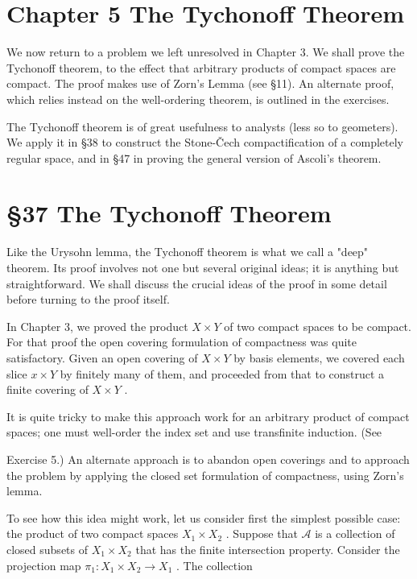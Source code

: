 \documentclass[10pt]{article}
\begin{document}
\section*{Chapter 5 The Tychonoff Theorem}

We now return to a problem we left unresolved in Chapter 3. We shall prove the Tychonoff theorem, to the effect that arbitrary products of compact spaces are compact. The proof makes use of Zorn's Lemma (see §11). An alternate proof, which relies instead on the well-ordering theorem, is outlined in the exercises.

The Tychonoff theorem is of great usefulness to analysts (less so to geometers). We apply it in §38 to construct the Stone-Čech compactification of a completely regular space, and in §47 in proving the general version of Ascoli's theorem.

\section*{§37 The Tychonoff Theorem}

Like the Urysohn lemma, the Tychonoff theorem is what we call a "deep" theorem. Its proof involves not one but several original ideas; it is anything but straightforward. We shall discuss the crucial ideas of the proof in some detail before turning to the proof itself.

In Chapter 3, we proved the product \(X \times  Y\) of two compact spaces to be compact. For that proof the open covering formulation of compactness was quite satisfactory. Given an open covering of \(X \times  Y\) by basis elements, we covered each slice \(x \times  Y\) by finitely many of them, and proceeded from that to construct a finite covering of \(X \times  Y\) .

It is quite tricky to make this approach work for an arbitrary product of compact spaces; one must well-order the index set and use transfinite induction. (See

Exercise 5.) An alternate approach is to abandon open coverings and to approach the problem by applying the closed set formulation of compactness, using Zorn's lemma.

To see how this idea might work, let us consider first the simplest possible case: the product of two compact spaces \({X}_{1} \times  {X}_{2}\) . Suppose that \(\mathcal{A}\) is a collection of closed subsets of \({X}_{1} \times  {X}_{2}\) that has the finite intersection property. Consider the projection map \({\pi }_{1} : {X}_{1} \times  {X}_{2} \rightarrow  {X}_{1}\) . The collection
\end{document}
